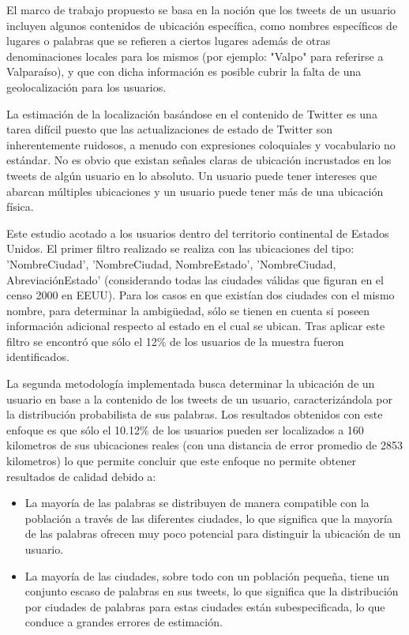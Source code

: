 El marco de trabajo propuesto se basa en la noción que los tweets de un usuario incluyen algunos contenidos de ubicación específica, como nombres específicos de lugares o palabras que se refieren a ciertos lugares además de otras denominaciones locales para los mismos (por ejemplo: "Valpo" para referirse a Valparaíso), y que con dicha información es posible cubrir la falta de una geolocalización para los usuarios.

La estimación de la localización basándose en el contenido de Twitter es una tarea difícil puesto que las actualizaciones de estado de Twitter son inherentemente ruidosos, a menudo con expresiones coloquiales y vocabulario no estándar. No es obvio que existan señales claras de ubicación incrustados en los tweets de algún usuario en lo absoluto. Un usuario puede tener intereses que abarcan múltiples ubicaciones y un usuario puede tener más de una ubicación física.

Este estudio acotado a los usuarios dentro del territorio continental de Estados Unidos. El primer filtro realizado se realiza con las ubicaciones del tipo: 'NombreCiudad', 'NombreCiudad, NombreEstado', 'NombreCiudad, AbreviaciónEstado' (considerando todas las ciudades válidas que figuran en el censo 2000 en EEUU). Para los casos en que existían dos ciudades con el mismo nombre, para determinar la ambigüedad, sólo se tienen en cuenta si poseen información adicional respecto al estado en el cual se ubican. Tras aplicar este filtro se encontró que sólo el 12\% de los usuarios de la muestra fueron identificados.

La segunda metodología implementada busca determinar la ubicación de un usuario en base a la contenido de los tweets de un usuario, caracterizándola por la distribución probabilista de sus palabras. Los resultados obtenidos con este enfoque es que sólo el 10.12\% de los usuarios pueden ser localizados a 160 kilometros de sus ubicaciones reales (con una distancia de error promedio de 2853 kilometros) lo que permite concluir que este enfoque no permite obtener resultados de calidad debido a:

\begin{itemize}
    \item La mayoría de las palabras se distribuyen de manera compatible con la población a través de las diferentes ciudades, lo que significa que la mayoría de las palabras ofrecen muy poco potencial para distinguir la ubicación de un usuario.
    \item La mayoría de las ciudades, sobre todo con un población pequeña, tiene un conjunto escaso de palabras en sus tweets, lo que significa que la distribución por ciudades de palabras para estas ciudades están subespecificada, lo que conduce a grandes errores de estimación.
\end{itemize}

